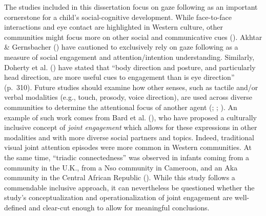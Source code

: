 \documentclass[
]{scrbook}
\begin{document}
The studies included in this dissertation focus on gaze following as an important cornerstone for a child's social-cognitive development. While face-to-face interactions and eye contact are highlighted in Western culture, other communities might focus more on other social and communicative cues (). Akhtar \& Gernsbacher () have cautioned to exclusively rely on gaze following as a measure of social engagement and attention/intention understanding. Similarly, Doherty et al. () have stated that ``body direction and posture, and particularly head direction, are more useful cues to engagement than is eye direction'' (p.~310). Future studies should examine how other senses, such as tactile and/or verbal modalities (e.g., touch, prosody, voice direction), are used across diverse communities to determine the attentional focus of another agent (; ; ). An example of such work comes from Bard et al. (), who have proposed a culturally inclusive concept of \emph{joint engagement} which allows for these expressions in other modalities and with more diverse social partners and topics. Indeed, traditional visual joint attention episodes were more common in Western communities. At the same time, ``triadic connectedness'' was observed in infants coming from a community in the U.K., from a Nso community in Cameroon, and an Aka community in the Central African Republic (). While this study follows a commendable inclusive approach, it can nevertheless be questioned whether the study's conceptualization and operationalization of joint engagement are well-defined and clear-cut enough to allow for meaningful conclusions.
\end{document}
